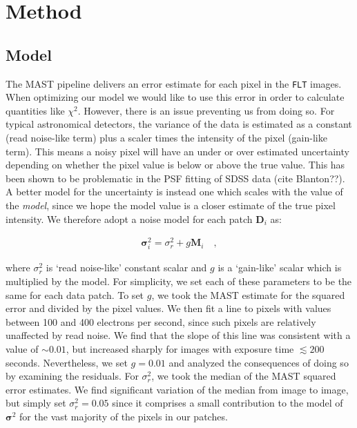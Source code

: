 \documentclass[12pt,letterpaper,preprint]{aastex}
\newcommand{\vect}[1]{\mathbf{#1}}
\newcommand{\FLT}{\texttt{FLT}\,\,}
\newcommand{\data}{\vect{D}}
\newcommand{\model}{\vect{M}}
\newcommand{\var}{\vect{\sigma}^2}
\begin{document}
\section{Method}

\subsection{Model}

The MAST pipeline delivers an error estimate for each pixel in the \FLT images.   When optimizing 
our model we would like to use this error in order to calculate quantities like $\chi^2$.  However, 
there is an issue preventing us from doing so.  For typical astronomical detectors, the variance of 
the data is estimated as a constant (read noise-like term) plus a scaler times the intensity of the pixel 
(gain-like term).  This means a noisy pixel will have an under or over estimated uncertainty depending 
on whether the pixel value is below or above the true value.  This has been shown to be 
problematic in the PSF fitting of SDSS data (cite Blanton??).  A better model for the uncertainty is 
instead one which scales with the value of the \emph{model}, since we hope the model value is a 
closer estimate of the true pixel intensity.  We therefore adopt a noise model for each patch $\data_i$
as:

\begin{eqnarray}
\var_i =  \sigma_{r}^2 + g \model_i
\quad , 
\label{eqn:model-noflat}
\end{eqnarray}

\noindent where $\sigma_{r}^2$ is `read noise-like' constant scalar and $g$ is a `gain-like' scalar 
which is multiplied by the model.  For simplicity, we set each of these parameters to be the same 
for each data patch.  To set $g$, we took the MAST estimate for the squared error and 
divided by the pixel values.  We then fit a line to pixels with values between 100 and 
400 electrons per second, since such pixels are relatively unaffected by read noise.  We find that 
the slope of this line was consistent with a value of 
$\sim0.01$, but increased sharply for images with exposure time $\lesssim 200$ seconds.  
Nevertheless, we set $g=0.01$ and analyzed the consequences of doing so by examining the 
residuals.  For $\sigma_{r}^2$, we took the median of the MAST squared error estimates.  We find 
significant variation of the median from image to image, but simply set $\sigma_{r}^2=0.05$ since 
it comprises a small contribution to the model of $\var$ for the vast majority of the pixels in our 
patches.
\end{document}
